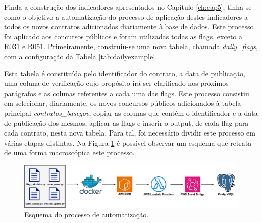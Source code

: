 

Finda a construção dos indicadores apresentados no Capítulo \ref{ch:cap5}, tinha-se como o objetivo a automatização do processo de aplicação destes indicadores a todos os novos contratos adicionados diariamente à base de dados. Este processo foi aplicado aos concursos públicos e foram utilizadas todas as flags, exceto a R031 e R051. Primeiramente, construiu-se uma nova tabela, chamada \textit{daily\_flags}, com a configuração da Tabela \ref{tab:dailyexample}. 


\begin{table}[H]
	\centering
	\renewcommand{\arraystretch}{1.15}
	\setlength{\tabcolsep}{15pt}
	\caption{Exemplo de aplicação de todos os indicadores binários a um concurso público.}
	\label{tab:dailyexample}
\end{table}

Esta tabela é constituída pelo identificador do contrato, a data de publicação, uma coluna de verificação cujo propósito irá ser clarificado nos próximos parágrafos e as colunas referentes a cada uma das flags. Este processo consistiu em selecionar, diariamente, os novos concursos públicos adicionados à tabela principal \textit{contratos\_basegov}, copiar as colunas que contém o identificador e a data de publicação dos mesmos, aplicar as flags e inserir o output, de cada flag para cada contrato, nesta nova tabela. Para tal, foi necessário dividir este processo em várias etapas distintas. Na Figura \ref{fig:esquema} é possível observar um esquema que retrata de uma forma macroscópica este processo.  


\begin{figure}[H]
	\centering
	\includegraphics[width=\textwidth]{imagens/daily_flags_v2.png}
	\caption{Esquema do processo de automatização.}
	\label{fig:esquema}
\end{figure}


